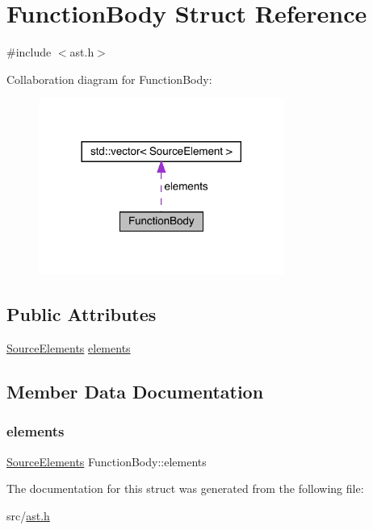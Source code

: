 \hypertarget{struct_function_body}{}\section{Function\+Body Struct Reference}
\label{struct_function_body}


{\ttfamily \#include $<$ast.\+h$>$}



Collaboration diagram for Function\+Body\+:\nopagebreak
\begin{figure}[H]
\begin{center}
\leavevmode
\includegraphics[width=228pt]{struct_function_body__coll__graph}
\end{center}
\end{figure}
\subsection*{Public Attributes}
\begin{DoxyCompactItemize}
\item 
\hyperlink{ast_8h_ae3267d5aa063c01bcbdeb38763a616ac}{Source\+Elements} \hyperlink{struct_function_body_a5fe1a2147c92225439e7200766367492}{elements}
\end{DoxyCompactItemize}


\subsection{Member Data Documentation}
\mbox{\label{struct_function_body_a5fe1a2147c92225439e7200766367492}} 
\subsubsection{\texorpdfstring{elements}{elements}}
{\footnotesize\ttfamily \hyperlink{ast_8h_ae3267d5aa063c01bcbdeb38763a616ac}{Source\+Elements} Function\+Body\+::elements}



The documentation for this struct was generated from the following file\+:\begin{DoxyCompactItemize}
\item 
src/\hyperlink{ast_8h}{ast.\+h}\end{DoxyCompactItemize}
